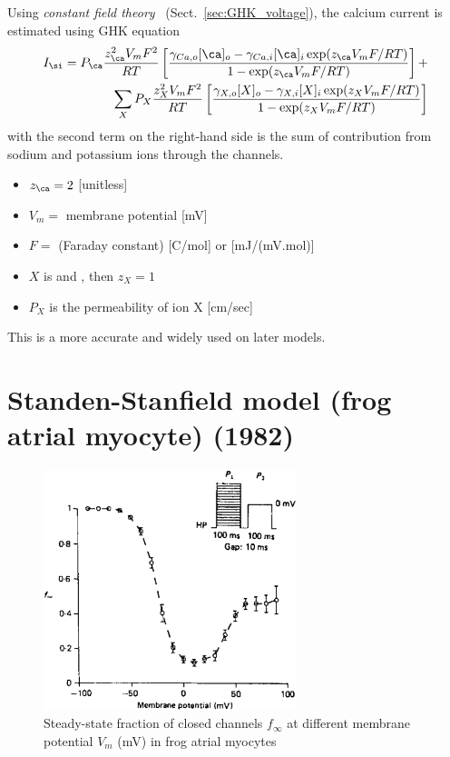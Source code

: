 \begin{framed}
  Using {\it constant field theory}~\citep{pickard1976gghk}
  (Sect.~\ref{sec:GHK_voltage}), the calcium current is estimated
  using GHK equation
  \begin{equation}
    \label{eq:360}
    \begin{split}
      I_\si = P_\ca \frac{z_\ca ^2V_mF^2}{RT} \left[ 
      \frac{\gamma_{Ca,o}[\ca]_o-\gamma_{Ca,i}[\ca]_i\exp(z_\ca V_mF/RT)}{1-\exp(z_\ca V_mF/RT)}\right] +\\
      \sum_X P_X \frac{z_{X}^2V_mF^2}{RT} \left[
        \frac{\gamma_{X,o}[X]_o-\gamma_{X,i}[X]_i\exp(z_{X}V_mF/RT)}{1-\exp(z_{X}V_mF/RT)}\right]
    \end{split}
  \end{equation}
  with the second term on the right-hand side is the sum of contribution
  from sodium and potassium ions through the channels.
  \begin{itemize}
  \item $z_\ca =2$ [unitless]
  \item $V_m=$ membrane potential [mV]
  \item $F=$ (Faraday constant) [C/mol] or [mJ/(mV.mol)]
  \item $X$ is  and , then $z_X = 1$
  \item $P_X$ is the permeability of ion X [cm/sec]
  \end{itemize}
  This is a more accurate and widely used on later models. 
\end{framed}

\section[Standen-Stanfield model (1982)]{Standen-Stanfield model (frog atrial
  myocyte) (1982)}
\label{sec:standen_1982model}

\begin{figure}[hbt]
  \centerline{\includegraphics[height=7cm,
    angle=0]{./images/Ca_inactivation.eps}}
  \caption{Steady-state fraction of closed channels $f_\infty$ at different
  membrane potential $V_m$ (mV) in frog atrial myocytes}
  \label{fig:Ca_inactivation}
\end{figure}

